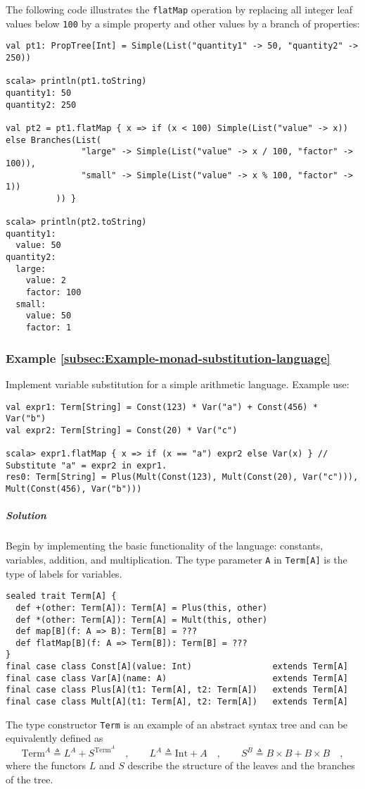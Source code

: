 The following code illustrates the \lstinline!flatMap! operation
by replacing all integer leaf values below \lstinline!100! by a simple
property and other values by a branch of properties:
\begin{lstlisting}
val pt1: PropTree[Int] = Simple(List("quantity1" -> 50, "quantity2" -> 250))

scala> println(pt1.toString)
quantity1: 50
quantity2: 250

val pt2 = pt1.flatMap { x => if (x < 100) Simple(List("value" -> x)) else Branches(List(
               "large" -> Simple(List("value" -> x / 100, "factor" -> 100)),
               "small" -> Simple(List("value" -> x % 100, "factor" -> 1))
          )) }

scala> println(pt2.toString)
quantity1:
  value: 50
quantity2:
  large:
    value: 2
    factor: 100
  small:
    value: 50
    factor: 1
\end{lstlisting}


\subsubsection{Example \label{subsec:Example-monad-substitution-language}\ref{subsec:Example-monad-substitution-language}}

Implement variable substitution for a simple arithmetic language.
Example use:
\begin{lstlisting}
val expr1: Term[String] = Const(123) * Var("a") + Const(456) * Var("b")
val expr2: Term[String] = Const(20) * Var("c")

scala> expr1.flatMap { x => if (x == "a") expr2 else Var(x) } // Substitute "a" = expr2 in expr1.
res0: Term[String] = Plus(Mult(Const(123), Mult(Const(20), Var("c"))), Mult(Const(456), Var("b"))) 
\end{lstlisting}


\subparagraph{Solution}

Begin by implementing the basic functionality of the language: constants,
variables, addition, and multiplication. The type parameter \lstinline!A!
in \lstinline!Term[A]! is the type of labels for variables. 
\begin{lstlisting}
sealed trait Term[A] {
  def +(other: Term[A]): Term[A] = Plus(this, other)
  def *(other: Term[A]): Term[A] = Mult(this, other)
  def map[B](f: A => B): Term[B] = ???
  def flatMap[B](f: A => Term[B]): Term[B] = ???
}
final case class Const[A](value: Int)                extends Term[A]
final case class Var[A](name: A)                     extends Term[A]
final case class Plus[A](t1: Term[A], t2: Term[A])   extends Term[A]
final case class Mult[A](t1: Term[A], t2: Term[A])   extends Term[A]
\end{lstlisting}
The type constructor \lstinline!Term! is an example of an abstract
syntax tree and can be equivalently defined
as
\[
\text{Term}^{A}\triangleq L^{A}+S^{\text{Term}^{A}}\quad,\quad\quad L^{A}\triangleq\text{Int}+A\quad,\quad\quad S^{B}\triangleq B\times B+B\times B\quad,
\]
where the functors $L$ and $S$ describe the structure of the leaves
and the branches of the tree.

